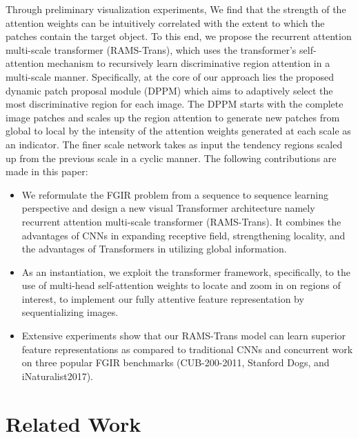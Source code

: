 \documentclass[sigconf]{acmart}
\begin{document}
Through preliminary visualization experiments, We find that the strength of the attention weights can be intuitively correlated with the extent to which the patches contain the target object. To this end, we propose the recurrent attention multi-scale transformer (RAMS-Trans), which uses the transformer's self-attention mechanism to recursively learn discriminative region attention in a multi-scale manner. Specifically, at the core of our approach lies the proposed dynamic patch proposal module (DPPM) which aims to adaptively select the most discriminative region for each image. The DPPM starts with the complete image patches and scales up the region attention to generate new patches from global to local by the intensity of the attention weights generated at each scale as an indicator. The finer scale network takes as input the tendency regions scaled up from the previous scale in a cyclic manner. The following contributions are made in this paper:
\begin{itemize}
\item We reformulate the FGIR problem from a sequence to sequence learning perspective and design a new visual Transformer architecture namely recurrent attention multi-scale transformer (RAMS-Trans). It combines the advantages of CNNs in expanding receptive field, strengthening locality, and the advantages of Transformers in utilizing global information.
\item As an instantiation, we exploit the transformer framework, specifically, to the use of multi-head self-attention weights to locate and zoom in on regions of interest, to implement our fully attentive feature representation by sequentializing images.
\item Extensive experiments show that our RAMS-Trans model can learn superior feature representations as compared to traditional CNNs and concurrent work on three popular FGIR benchmarks (CUB-200-2011, Stanford Dogs, and iNaturalist2017).
\end{itemize}

\section{Related Work}
\end{document}
